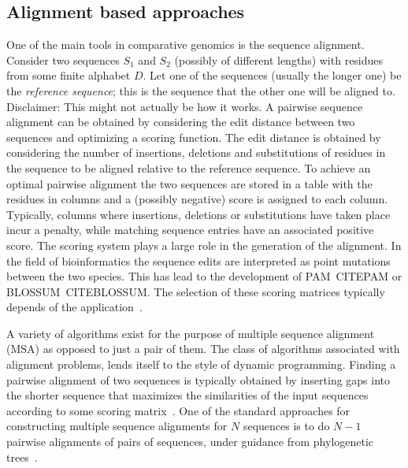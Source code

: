         \subsection{Alignment based approaches}
            One of the main tools in comparative genomics is the sequence alignment. 
            Consider two sequences $S_1$ and $S_2$ (possibly of different lengths) with residues from some finite alphabet $D$. Let one of the sequences (usually the longer one) be the \emph{reference sequence}; this is the sequence that the other one will be aligned to. 
            {\color{red}Disclaimer: This might not actually be how it works.}
            A pairwise sequence alignment can be obtained by considering the edit distance between two sequences and optimizing a scoring function. The edit distance is obtained by considering the number of insertions, deletions and substitutions of residues in the sequence to be aligned relative to the reference sequence. To achieve an optimal pairwise alignment the two sequences are stored in a table with the residues in columns and a (possibly negative) score is assigned to each column. Typically, columns where insertions, deletions or substitutions have taken place incur a penalty, while matching sequence entries have an associated positive score. The scoring system plays a large role in the generation of the alignment. In the field of bioinformatics the sequence edits are interpreted as point mutations between the two species. This has lead to the development of PAM~CITEPAM or BLOSSUM~CITEBLOSSUM. The selection of these scoring matrices typically depends of the application~\cite{mount2008comparison}.

            A variety of algorithms exist for the purpose of multiple sequence alignment (MSA) as opposed to just a pair of them. The class of algorithms associated with alignment problems, lends itself to the style of dynamic programming. Finding a pairwise alignment of two sequences is typically obtained by inserting gaps into the shorter sequence that maximizes the similarities of the input sequences according to some scoring matrix~\cite{edgar2006multiple}. One of the standard approaches for constructing multiple sequence alignments for $N$ sequences is to do $N-1$ pairwise alignments of pairs of sequences, under guidance from phylogenetic trees~\cite{feng1987progressive}.
